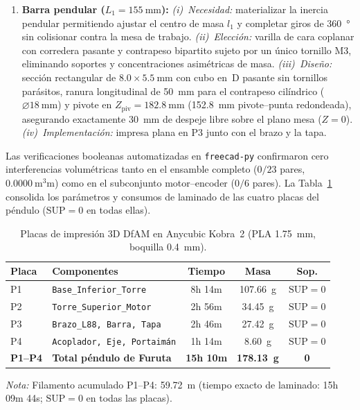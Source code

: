 \begin{enumerate}
    \item \textbf{Barra pendular ($L_1=\qty{155}{\milli\meter}$):}
    \textit{(i)~Necesidad:} materializar la inercia pendular permitiendo ajustar el centro de masa $l_1$ y completar giros de \qty{360}{\degree} sin colisionar contra la mesa de trabajo.
    \textit{(ii)~Elección:} varilla de cara coplanar con corredera pasante y contrapeso bipartito sujeto por un único tornillo M3, eliminando soportes y concentraciones asimétricas de masa.
    \textit{(iii)~Diseño:} sección rectangular de $8.0\times\qty{5.5}{\milli\meter}$ con cubo en~D pasante sin tornillos parásitos, ranura longitudinal de \qty{50}{\milli\meter} para el contrapeso cilíndrico ($\varnothing\qty{18}{\milli\meter}$) y pivote en $Z_{\text{piv}}=\qty{182.8}{\milli\meter}$ (\qty{152.8}{\milli\meter} pivote--punta redondeada), asegurando exactamente \qty{30}{\milli\meter} de despeje libre sobre el plano mesa ($Z=0$).
    \textit{(iv)~Implementación:} impresa plana en P3 junto con el brazo y la tapa.
\end{enumerate}

Las verificaciones booleanas automatizadas en \texttt{freecad-py} confirmaron cero interferencias volumétricas tanto en el ensamble completo ($0/23$ pares, $\qty{0.0000}{\cubic\milli\meter}$) como en el subconjunto motor--encoder ($0/6$ pares). La Tabla~\ref{tab:placas_impresion} consolida los parámetros y consumos de laminado de las cuatro placas del péndulo ($\text{SUP}=0$ en todas ellas).

\begin{table}[!t]
    \centering
    \caption{Placas de impresión 3D DfAM en Anycubic Kobra~2 (PLA \qty{1.75}{\milli\meter}, boquilla \qty{0.4}{\milli\meter}).}
    \label{tab:placas_impresion}
    \scriptsize
    \setlength{\tabcolsep}{2.6pt}
    \begin{tabular}{@{}llccc@{}}
        \toprule
        \textbf{Placa} & \textbf{Componentes} & \textbf{Tiempo} & \textbf{Masa} & \textbf{Sop.} \\
        \midrule
        P1 & \texttt{Base\_Inferior\_Torre} & 8h 14m & \qty{107.66}{\gram} & $\text{SUP}=0$ \\
        P2 & \texttt{Torre\_Superior\_Motor} & 2h 56m & \qty{34.45}{\gram} & $\text{SUP}=0$ \\
        P3 & \texttt{Brazo\_L88, Barra, Tapa} & 2h 46m & \qty{27.42}{\gram} & $\text{SUP}=0$ \\
        P4 & \texttt{Acoplador, Eje, Portaimán} & 1h 14m & \qty{8.60}{\gram} & $\text{SUP}=0$ \\
        \midrule
        \textbf{P1--P4} & \textbf{Total péndulo de Furuta} & \textbf{15h 10m} & \textbf{\qty{178.13}{\gram}} & \textbf{0} \\
        \bottomrule
    \end{tabular}\par
    \vspace{2pt}
    \raggedright\scriptsize\textit{Nota:} Filamento acumulado P1--P4: \qty{59.72}{\meter} (tiempo exacto de laminado: 15h 09m 44s; $\text{SUP}=0$ en todas las placas).
\end{table}

